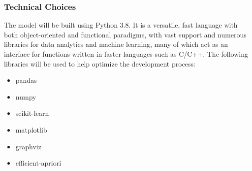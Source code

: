 \documentclass[a4paper,11pt]{article}
\begin{document}
\subsubsection{Technical Choices}
The model will be built using Python 3.8. It is a versatile, fast language with both object-oriented and functional paradigms, with vast support and numerous libraries for data analytics and machine learning, many of which act as an interface for functions written in faster languages such as C/C++. The following libraries will be used to help optimize the development process:
\begin{itemize}
\item pandas
\item numpy
\item scikit-learn
\item matplotlib
\item graphviz
\item efficient-apriori
\end{itemize}
\end{document}

